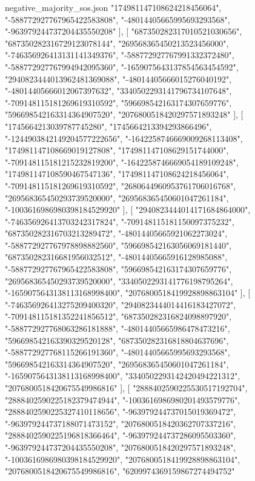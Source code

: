 \begin{filecontents*}[overwrite]{negative_majority_sos.json}
    "174981147108624218456064",
    "-588772927767965422583808",
    "-48014405665995693293568",
    "-963979244737204435550208"
   ],
   [
    "687350282317010521030656",
    "687350282316729123078144",
    "269568365450213523456000",
    "-746356926413131141349376",
    "-588772927767991332372480",
    "-588772927767994942095360",
    "-1659075643137854563454592",
    "2940823444013962481369088",
    "-48014405666015276040192",
    "-48014405666012067397632",
    "3340502293141796734107648",
    "-709148115181269619310592",
    "596698542163174307659776",
    "596698542163314364907520",
    "2076800518420297571893248"
   ],
   [
    "1745664213039787745280",
    "1745664213394293866496",
    "-1244903842149204577222656",
    "-1642258746669009268113408",
    "174981147108669019127808",
    "174981147108629151744000",
    "-709148115181215232819200",
    "-1642258746669054189109248",
    "174981147108590467547136",
    "174981147108624218456064",
    "-709148115181269619310592",
    "2680644960953761706016768",
    "269568365450293739520000",
    "269568365450601047261184",
    "-1003616986980398184529920"
   ],
   [
    "2940823444014171684864000",
    "-746356926413703242317824",
    "-709148115181150097375232",
    "687350282316703213289472",
    "-48014405665921062273024",
    "-588772927767978898882560",
    "596698542163056069181440",
    "687350282316681956032512",
    "-48014405665916128985088",
    "-588772927767965422583808",
    "596698542163174307659776",
    "269568365450293739520000",
    "3340502293141776198795264",
    "-1659075643138113168998400",
    "2076800518419928898863104"
   ],
   [
    "-746356926413275209400320",
    "2940823444014416183427072",
    "-709148115181352241856512",
    "687350282316824098897920",
    "-588772927768063286181888",
    "-48014405665986478473216",
    "596698542163390329520128",
    "687350282316818804637696",
    "-588772927768115266191360",
    "-48014405665995693293568",
    "596698542163314364907520",
    "269568365450601047261184",
    "-1659075643138113168998400",
    "3340502293142420494221312",
    "2076800518420675549986816"
   ],
   [
    "2888402590225530517192704",
    "2888402590225182379474944",
    "-1003616986980201493579776",
    "2888402590225327410118656",
    "-963979244737015019369472",
    "-963979244737188071473152",
    "2076800518420362707337216",
    "2888402590225196818366464",
    "-963979244737286095503360",
    "-963979244737204435550208",
    "2076800518420297571893248",
    "-1003616986980398184529920",
    "2076800518419928898863104",
    "2076800518420675549986816",
    "6209974369159867274494752"

\end{filecontents*}
